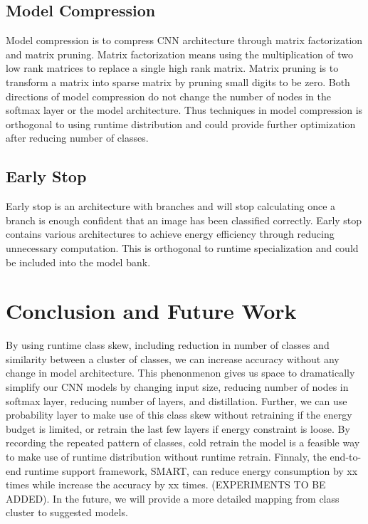 \documentclass[conference]{IEEEtran}
\begin{document}
\begin{spacing}{0.9}
\subsection{Model Compression}
Model compression is to compress CNN architecture through matrix factorization and matrix pruning. Matrix factorization \cite{jaderberg2014speeding, kim2015compression, romero2014fitnets, xue2014singular} means using the multiplication of two low rank matrices to replace a single high rank matrix. Matrix pruning \cite{chen2015compressing, han2015learning} is to transform a matrix into sparse matrix by pruning small digits to be zero. Both directions of model compression do not change the number of nodes in the softmax layer or the model architecture. Thus techniques in model compression is orthogonal to using runtime distribution and could provide further optimization after reducing number of classes. 


\subsection{Early Stop} 
Early stop \cite{teerapittayanon2016branchynet, panda2016conditional} is an architecture with branches and will stop calculating once a branch is enough confident that an image has been classified correctly. Early stop contains various architectures to achieve energy efficiency through reducing unnecessary computation. This is orthogonal to runtime specialization and could be included into the model bank.



\section{Conclusion and Future Work}
By using runtime class skew, including reduction in number of classes and similarity between a cluster of classes, we can increase accuracy without any change in model architecture. This phenonmenon gives us space to dramatically simplify our CNN models by changing input size, reducing number of nodes in softmax layer, reducing number of layers, and distillation.  Further, we can use probability layer to make use of this class skew without retraining if the energy budget is limited, or retrain the last few layers if energy constraint is loose. By recording the repeated pattern of classes, cold retrain the model is a feasible way to make use of runtime distribution without runtime retrain. Finnaly, the end-to-end runtime support framework, SMART, can reduce energy consumption by xx times while increase the accuracy by xx times. (EXPERIMENTS TO BE ADDED). In the future, we will provide a more detailed mapping from class cluster to suggested models.



\end{spacing}
\end{document}

